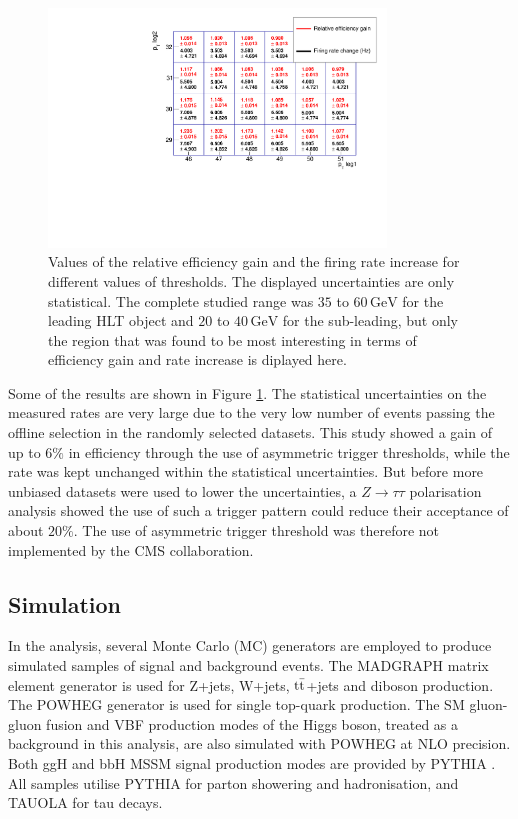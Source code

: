 \begin{figure}
    \centering
    \includegraphics[width=0.8\textwidth]{Images/asym_results.pdf}
    \caption{Values of the relative efficiency gain and the firing rate increase for different values of \pt thresholds. The displayed uncertainties are only statistical. The complete studied range was $35$ to $60\,\mathrm{GeV}$ for the leading HLT \tauh object and $20$ to $40\,\mathrm{GeV}$ for the sub-leading, but only the region that was found to be most interesting in terms of efficiency gain and rate increase is diplayed here.}
    \label{fig:asym}
\end{figure}

Some of the results are shown in Figure \ref{fig:asym}. The statistical uncertainties on the measured rates are very large due to the very low number of events passing the offline selection in the randomly selected datasets. This study showed a gain of up to $6\%$ in efficiency through the use of asymmetric trigger thresholds, while the rate was kept unchanged within the statistical uncertainties. But before more unbiased datasets were used to lower the uncertainties, a $Z\rightarrow \tau\tau$ polarisation analysis showed the use of such a trigger pattern could reduce their acceptance of about $20\%$. The use of asymmetric \tauh trigger \pt threshold was therefore not implemented by the CMS collaboration.

\subsection{Simulation}
In the analysis, several Monte Carlo (MC) generators are employed to produce simulated samples of signal and background events. The MADGRAPH \cite{Alwall2011} matrix element generator is used for Z+jets, W+jets, $\mathrm{t\Bar{t}}$+jets and diboson production. The POWHEG \cite{Alioli2010} generator is used for single top-quark production. The SM gluon-gluon fusion and VBF production modes of the Higgs boson, treated as a background in this analysis, are also simulated with POWHEG at NLO precision. Both ggH and bbH MSSM signal production modes are provided by PYTHIA \cite{SJOSTRAND2008852}. All samples utilise PYTHIA for parton showering and hadronisation, and TAUOLA \cite{JADACH1991275} for tau decays.


